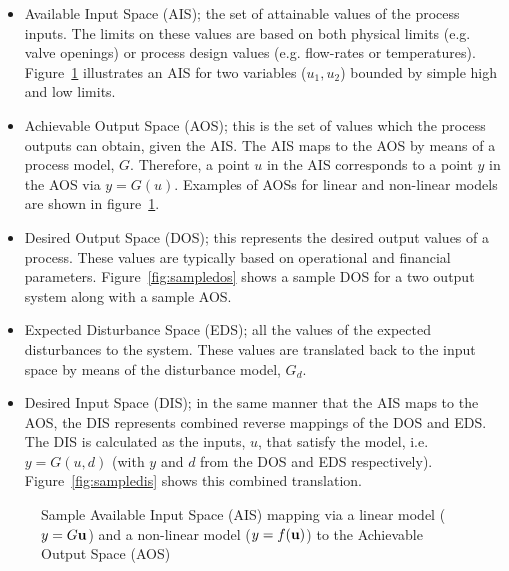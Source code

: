 \begin{itemize}
  \item Available Input Space (AIS); the set of attainable values of the process inputs. 
    The limits on these values are based on both physical limits (e.g.     valve openings) or process design values (e.g. flow-rates or temperatures). 
Figure~\ref{fig:sampleaisaos} illustrates an AIS for two variables ($u_1, u_2$) bounded by simple high and low limits.%
%
  \item Achievable Output Space (AOS); this is the set of values which the process outputs can obtain, given the AIS. 
The AIS maps to the AOS by means of a process model, $G$. 
Therefore, a point $u$ in the AIS corresponds to a point $y$ in the AOS via $y=G(u)$. 
Examples of AOSs for linear and non-linear models are shown in figure~\ref{fig:sampleaisaos}.%
%
%
  \item Desired Output Space (DOS); this represents the desired output values of a process. 
These values are typically based on operational and financial   parameters. 
Figure~\ref{fig:sampledos} shows a sample DOS for a two output    system along with a sample AOS.%
%
  \item Expected Disturbance Space (EDS); all the values of the expected disturbances to the system. 
These values are translated back to the input space by means of the disturbance model, $G_d$.%
%
  \item Desired Input Space (DIS); in the same manner that the AIS maps to the AOS, the DIS represents combined reverse mappings of the DOS and EDS.
The DIS is calculated as the inputs, $u$, that satisfy the model, i.e. $y=G(u,d)$ (with $y$ and $d$ from the DOS and EDS respectively).
Figure~\ref{fig:sampledis} shows this combined translation.%
%
%
\end{itemize}

\begin{figure}[htbp]
  \centering
  \scalebox{1}{}
  \caption[Sample Available Input Space mapping to Achievable Output Space]{Sample Available Input Space (AIS) mapping via a linear model ($y=G{\bf {u}}$) and a non-linear model ($y=f({\bf {u}})$) to the Achievable Output Space (AOS)}
  \label{fig:sampleaisaos}
\end{figure}


